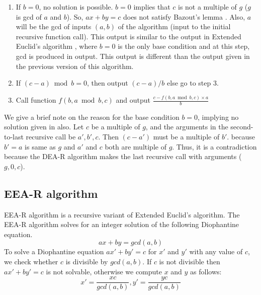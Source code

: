 \documentclass[pdflatex,sn-mathphys-num]{sn-jnl}%
\theoremstyle{thmstyleone}%
\theoremstyle{thmstyletwo}%
\theoremstyle{thmstylethree}%
\begin{document}
\begin{enumerate}
    \item If $b=0$, no solution is possible. $b=0$ implies that $c$ is not a multiple of $g$ ($g$ is gcd of $a$ and $b$). So, $ax+by=c$ does not satisfy Bazout's lemma \cite{seroul2012programming}. Also, $a$ will be the gcd of inputs $(a,b)$ of the algorithm (input to the initial recursive function call). This output is similar to the output in Extended Euclid's algorithm \cite{cormen2009introduction}, where $b=0$ is the only base condition and at this step, gcd is produced in output. This output is different than the output given in the previous version of this algorithm.
    \item If $(c-a) \bmod b=0$, then output $(c-a)/b$ else go to step 3.
    \item Call function $f(b,a \bmod b,c)$ and output \newline $\frac{c-f(b,a \bmod b,c)\times a}{b}$
\end{enumerate}
    We give a brief note on the reason for the base condition $b=0$, implying no solution given in \cite{deora2023algorithm} also. Let $c$ be a multiple of $g$, and the arguments in the second-to-last recursive call be $a',b',c$. Then $(c-a')$ must be a multiple of $b'$. because $b'= a$ is same as $g$ and $a'$ and $c$ both are multiple of $g$. Thus, it is a contradiction because the DEA-R algorithm makes the last recursive call with arguments ($g,0,c$).
\subsection{EEA-R algorithm}

EEA-R algorithm \cite{cormen2009introduction} is a recursive variant of Extended Euclid's algorithm. The EEA-R algorithm solves for an integer solution of the following Diophantine equation.
$$ax+by=gcd(a,b)$$
To solve a Diophantine equation $ax'+by'=c$ for $x'$ and $y'$ with any value of $c$, we check whether $c$ is divisible by $gcd(a,b)$. If $c$ is not divisible then $ax'+by'=c$ is not solvable, otherwise we compute $x$ and $y$ as follows:
$$x'=\frac{xc}{gcd(a,b)}, y'=\frac{yc}{gcd(a,b)}$$

\begin{algorithm}
\caption{EEA-R algorithm to solve 2-variable linear Diophantine equations \cite{cormen2009introduction}}



\end{algorithm}
\end{document}
